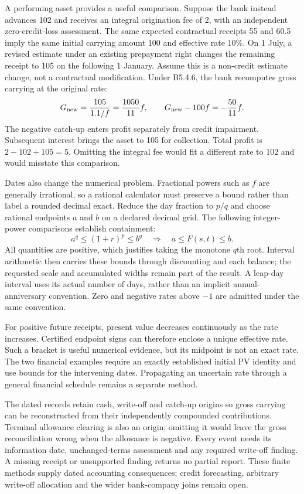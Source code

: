 A performing asset provides a useful comparison. Suppose the bank instead
advances 102 and receives an integral origination fee of 2, with an independent
zero-credit-loss assessment. The same expected contractual receipts 55 and
60.5 imply the same initial carrying amount 100 and effective rate 10\%.
On 1 July, a revised estimate under an existing prepayment right changes the
remaining receipt to 105 on the following 1 January. Assume this is a
non-credit estimate change, not a contractual modification. Under B5.4.6,
the bank recomputes gross carrying at the original rate:
\[
 G_{\rm new}=\frac{105}{1.1/f}=\frac{1050}{11}f,
 \qquad
 G_{\rm new}-100f=-\frac{50}{11}f.
\]
The negative catch-up enters profit separately from credit impairment.
Subsequent interest brings the asset to 105 for collection. Total profit is
\(2-102+105=5\). Omitting the integral fee would fit a different rate to
102 and would misstate this comparison.

Dates also change the numerical problem. Fractional powers such as \(f\)
are generally irrational, so a rational calculator must preserve a bound
rather than label a rounded decimal exact. Reduce the day fraction to
\(p/q\) and choose rational endpoints \(a\) and \(b\) on a declared
decimal grid. The following integer-power comparisons establish containment:
\[
 a^q\leq(1+r)^p\leq b^q
 \quad\Longrightarrow\quad
 a\leq F(s,t)\leq b.
\]
All quantities are positive, which justifies taking the monotone \(q\)th
root. Interval arithmetic then carries these bounds through discounting and
each balance; the requested scale and accumulated widths remain part of the
result. A leap-day interval uses its actual number of days, rather than an
implicit annual-anniversary convention. Zero and negative rates above
\(-1\) are admitted under the same convention.

For positive future receipts, present value decreases continuously as the rate
increases. Certified endpoint signs can therefore enclose a unique effective
rate. Such a bracket is useful numerical evidence, but its midpoint is not
an exact rate. The two financial examples require an exactly established
initial PV identity and use bounds for the intervening dates. Propagating an
uncertain rate through a general financial schedule remains a separate method.

The dated records retain cash, write-off and catch-up origins so gross carrying
can be reconstructed from their independently compounded contributions.
Terminal allowance clearing is also an origin; omitting it would leave the
gross reconciliation wrong when the allowance is negative. Every event needs
its information date, unchanged-terms assessment and any required write-off
finding. A missing receipt or unsupported finding returns no partial report.
These finite methods supply dated accounting consequences; credit forecasting,
arbitrary write-off allocation and the wider bank-company joins remain open.
